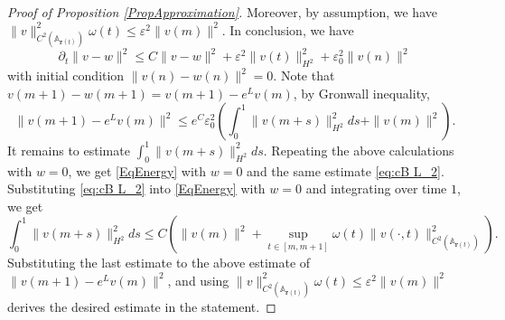 \documentclass[11pt]{amsart}
\numberwithin{equation}{section}
\numberwithin{equation}{section}
\newcommand{\eps}{\varepsilon}
\newcommand{\br}{\mathbf{r}}
\newcommand{\pr}{\partial}
\begin{document}
\begin{proof}[Proof of Proposition \ref{PropApproximation}]
		
		Moreover, by assumption, we have $\|v\|^2_{C^2(\mathbb A_{\mathbf r(t)})}\omega(t)\leq \eps^2\|v(m)\|^2$. 
		In conclusion, we have
		\begin{equation}\label{EqDiffH1}
			\pr_t \|v-w\|^2
			\leq C\|v-w\|^2+\eps^2\|v(t)\|_{H^2}^2+\eps_0^2\|v(n)\|^2
		\end{equation}
		with initial condition $\|v(n)-w(n)\|^2=0$. 
		Note that $v(m+1)-w(m+1)=v(m+1)-e^Lv(m)$, by Gronwall inequality,
		$$\|v(m+1)-e^Lv(m)\|^2\leq e^{C}\eps_0^2(\int_0^1\|v(m+s)\|_{H^2}^2ds+\|v(m)\|^2).$$
		It remains to estimate $\int_0^1\|v(m+s)\|_{H^2}^2ds$. Repeating the above calculations with $w=0$, we get \eqref{EqEnergy} with $w=0$ and the same estimate \eqref{eq:cB L_2}. Substituting \eqref{eq:cB L_2} into \eqref{EqEnergy} with $w=0$ and integrating over time $1$, we get 
		\begin{equation}\label{eq:LinearApproxH2}
			\int_0^1\|v(m+s)\|_{H^2}^2ds\leq C(\|v(m)\|^2+\sup_{t\in[m,m+1]}\omega(t)\|v(\cdot,t)\|^2_{C^2(\mathbb A_{\br(t)})}).
		\end{equation}
		Substituting the last estimate to the above estimate of $\|v(m+1)-e^Lv(m)\|^2$, and using $\|v\|^2_{C^2(\mathbb A_{\mathbf r(t)})}\omega(t)\leq \eps^2\|v(m)\|^2$ derives the desired estimate in the statement. 
		
	\end{proof}
\end{document}
